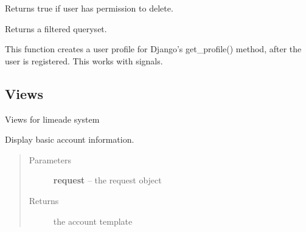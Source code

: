 \documentclass[letterpaper,10pt,english]{sphinxmanual}
\begin{document}
\begin{fulllineitems}
\begin{fulllineitems}
\end{fulllineitems}


\begin{fulllineitems}
\label{api/system:limeade.system.models.Product.has_delete_permission}
Returns true if user has permission to delete.

\end{fulllineitems}


\begin{fulllineitems}
\label{api/system:limeade.system.models.Product.queryset}
Returns a filtered queryset.

\end{fulllineitems}


\end{fulllineitems}


\begin{fulllineitems}
\label{api/system:limeade.system.models.create_user_profile}
This function creates a user profile for Django's get\_profile() method, 
after the user is registered. This works with signals.

\end{fulllineitems}



\subsection{Views}
\label{api/system:module-limeade.system.views}\label{api/system:views}
Views for limeade system

\begin{fulllineitems}
\label{api/system:limeade.system.views.account}
Display basic account information.
\begin{quote}\begin{description}
\item[{Parameters}] \leavevmode
\textbf{request} -- the request object

\item[{Returns}] \leavevmode
the account template

\end{description}\end{quote}

\end{fulllineitems}
\end{document}
